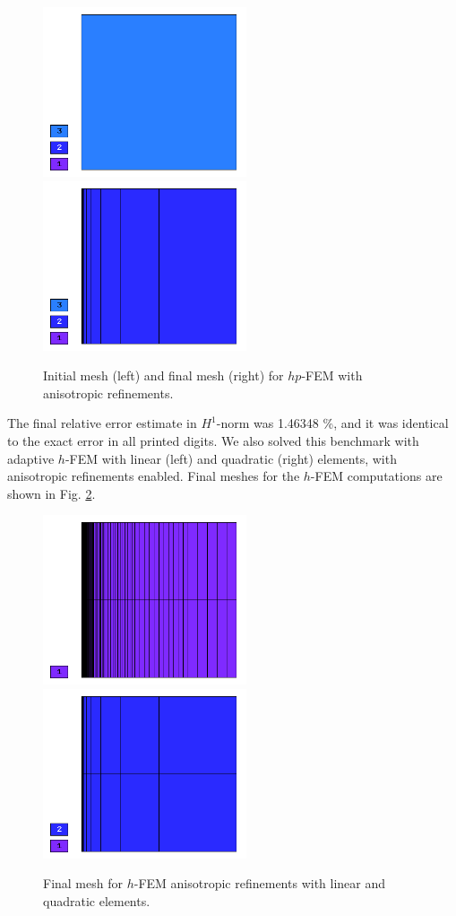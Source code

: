 \begin{figure}[!ht]
\centering
\includegraphics[height=5cm]{nist/nist-7/mesh_hp_aniso_init.png}\ \
\includegraphics[height=5cm]{nist/nist-7/mesh_hp_aniso.png}
\caption{Initial mesh (left) and final mesh (right) for $hp$-FEM with anisotropic refinements.}
\label{fig:nist-7-hp-aniso}
\end{figure}

The final relative error estimate in $H^1$-norm was 1.46348 \%,
and it was identical to the exact error in all printed digits.
We also solved this benchmark with adaptive $h$-FEM
with linear (left) and quadratic (right)
elements, with anisotropic refinements enabled.
Final meshes for the $h$-FEM computations are shown
in Fig. \ref{fig:nist-7-h-aniso}.

\begin{figure}[!ht]
\centering
\includegraphics[height=5cm]{nist/nist-7/mesh_h1_aniso.png}\ \
\includegraphics[height=5cm]{nist/nist-7/mesh_h2_aniso.png}
\caption{Final mesh for $h$-FEM anisotropic refinements with linear and quadratic elements.}
\label{fig:nist-7-h-aniso}
\end{figure}


